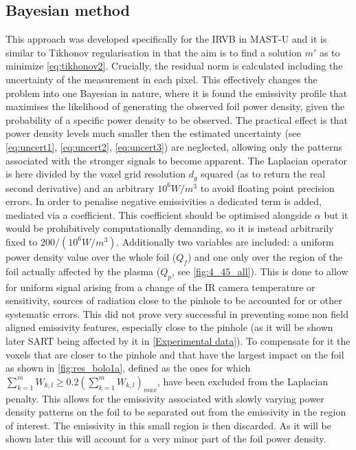 \subsection{Bayesian method}
This approach was developed specifically for the IRVB in MAST-U and it is similar to Tikhonov regularisation in that the aim is to find a solution $m'$ as to minimize \autoref{eq:tikhonov2}. Crucially, the residual norm is calculated including the uncertainty of the measurement in each pixel. This effectively changes the problem into one Bayesian in nature, where it is found the emissivity profile that maximises the likelihood of generating the observed foil power density, given the probability of a specific power density to be observed. The practical effect is that power density levels much smaller then the estimated uncertainty (see \autoref{eq:uncert1}, \ref{eq:uncert2}, \ref{eq:uncert3}) are neglected, allowing only the patterns associated with the stronger signals to become apparent. The Laplacian operator is here divided by the voxel grid resolution $d_g$ squared (as to return the real second derivative) and an arbitrary $10^6W/m^3$ to avoid floating point precision errors.
In order to penalise negative emissivities a dedicated term is added, mediated via a coefficient. This coefficient should be optimised alongside $\alpha$ but it would be prohibitively computationally demanding, so it is instead arbitrarily fixed to $200/(10^6W/m^3)$. Additionally two variables are included: a uniform power density value over the whole foil ($Q_f$) and one only over the region of the foil actually affected by the plasma ($Q_p$, see \autoref{fig:4_45_all}). This is done to allow for uniform signal arising from a change of the IR camera temperature or sensitivity, sources of radiation close to the pinhole to be accounted for or other systematic errors. This did not prove very successful in preventing some non field aligned emissivity features, especially close to the pinhole (as it will be shown later SART being affected by it  in \autoref{Experimental data}). To compensate for it the voxels that are closer to the pinhole and that have the largest impact on the foil as shown in \autoref{fig:res_bolo1a}, defined as the ones for which $\sum_{k=1}^{m} W_{k,l} \geq 0.2(\sum_{k=1}^{m} W_{k,l})_{max}$, have been excluded from the Laplacian penalty. This allows for the emissivity associated with slowly varying power density patterns on the foil to be separated out from the emissivity in the region of interest. The emissivity in this small region is then discarded. As it will be shown later this will account for a very minor part of the foil power density.

